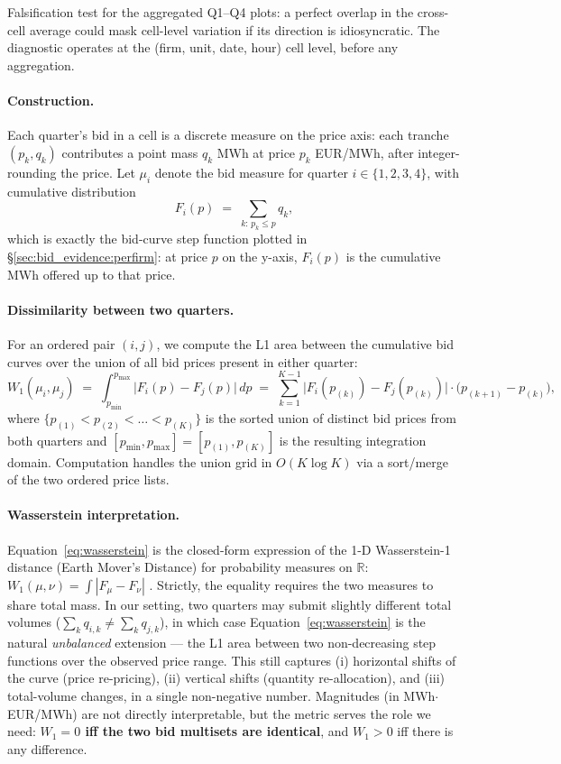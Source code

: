 \documentclass[11pt,a4paper]{article}
\begin{document}
Falsification test for the aggregated Q1--Q4 plots: a perfect overlap in the cross-cell average could mask cell-level variation if its direction is idiosyncratic. The diagnostic operates at the (firm, unit, date, hour) cell level, before any aggregation.

\paragraph{Construction.} Each quarter's bid in a cell is a discrete measure on the price axis: each tranche $(p_k, q_k)$ contributes a point mass $q_k$ MWh at price $p_k$ EUR/MWh, after integer-rounding the price. Let $\mu_i$ denote the bid measure for quarter $i \in \{1,2,3,4\}$, with cumulative distribution
\[
   F_i(p) \;=\; \sum_{k:\,p_k \leq p} q_k,
\]
which is exactly the bid-curve step function plotted in §\ref{sec:bid_evidence:perfirm}: at price $p$ on the y-axis, $F_i(p)$ is the cumulative MWh offered up to that price.

\paragraph{Dissimilarity between two quarters.} For an ordered pair $(i, j)$, we compute the L1 area between the cumulative bid curves over the union of all bid prices present in either quarter:
\begin{equation}\label{eq:wasserstein}
   W_1(\mu_i,\mu_j) \;=\; \int_{p_{\min}}^{p_{\max}} \bigl| F_i(p) - F_j(p) \bigr|\, dp \;=\; \sum_{k=1}^{K-1} \bigl| F_i(p_{(k)}) - F_j(p_{(k)}) \bigr|\cdot \bigl( p_{(k+1)} - p_{(k)} \bigr),
\end{equation}
where $\{p_{(1)} < p_{(2)} < \dots < p_{(K)}\}$ is the sorted union of distinct bid prices from both quarters and $[p_{\min}, p_{\max}] = [p_{(1)}, p_{(K)}]$ is the resulting integration domain. Computation handles the union grid in $O(K \log K)$ via a sort/merge of the two ordered price lists.

\paragraph{Wasserstein interpretation.} Equation~\ref{eq:wasserstein} is the closed-form expression of the 1-D Wasserstein-1 distance (Earth Mover's Distance) for probability measures on $\mathbb{R}$: $W_1(\mu, \nu) = \int |F_\mu - F_\nu|$ \citep{vallender1973}. Strictly, the equality requires the two measures to share total mass. In our setting, two quarters may submit slightly different total volumes ($\sum_k q_{i,k} \neq \sum_k q_{j,k}$), in which case Equation~\ref{eq:wasserstein} is the natural \emph{unbalanced} extension --- the L1 area between two non-decreasing step functions over the observed price range. This still captures (i) horizontal shifts of the curve (price re-pricing), (ii) vertical shifts (quantity re-allocation), and (iii) total-volume changes, in a single non-negative number. Magnitudes (in MWh$\cdot$EUR/MWh) are not directly interpretable, but the metric serves the role we need: \textbf{$W_1 = 0$ iff the two bid multisets are identical}, and $W_1 > 0$ iff there is any difference.
\end{document}
